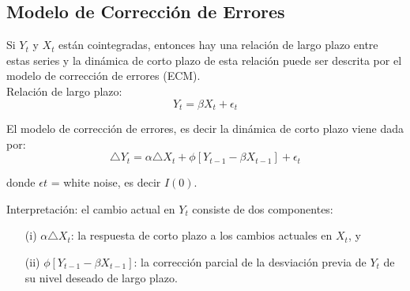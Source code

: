 \subsection{Modelo de Correcci\'on de Errores}
		Si $Y_t$ y $X_t$ est\'an cointegradas, entonces hay una relaci\'on de largo plazo entre estas series y la din\'amica de corto plazo de esta relaci\'on puede ser descrita por el modelo de correcci\'on de errores (ECM).\\
		
		\vspace{4mm}	
		Relación de largo plazo:\\
		
		\begin{equation}
		Y_t = \beta X_t  + \epsilon_t 
		\end{equation}
		
		
		El modelo de correcci\'on de errores, es decir la din\'amica de corto plazo viene dada por:\\
		
		\begin{equation}
		\triangle Y_t = \alpha \triangle X_t + \phi [Y_{t-1} - \beta X_{t-1} ] + \epsilon_t 
		\end{equation}
		
		donde $\epsilon t$ = white noise, es decir $I(0)$.\\
		\vspace{4mm}	
		
		Interpretaci\'on: el cambio actual en $Y_t$ consiste de dos componentes:\\
		
			\begin{itemize}
				\item[(i)] $\alpha \triangle X_t$: la respuesta de corto plazo a los cambios actuales en $X_t$, y
				\item[(ii)] $\phi [Y_{t-1} - \beta X_{t-1} ]$: la correcci\'on parcial de la desviaci\'on previa de $Y_t$ de su nivel deseado de largo plazo.
			\end{itemize}
		

